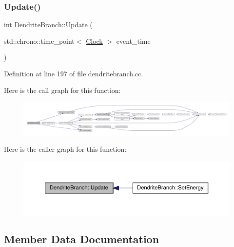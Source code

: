 \subsubsection{\texorpdfstring{Update()}{Update()}}
{\footnotesize\ttfamily int Dendrite\+Branch\+::\+Update (\begin{DoxyParamCaption}\item[{std\+::chrono\+::time\+\_\+point$<$ \hyperlink{universe_8h_a0ef8d951d1ca5ab3cfaf7ab4c7a6fd80}{Clock} $>$}]{event\+\_\+time }\end{DoxyParamCaption})}



Definition at line 197 of file dendritebranch.\+cc.

Here is the call graph for this function\+:
\nopagebreak
\begin{figure}[H]
\begin{center}
\leavevmode
\includegraphics[width=350pt]{class_dendrite_branch_a8540dfafeb5bd45f782ab31b8231b10f_cgraph}
\end{center}
\end{figure}
Here is the caller graph for this function\+:
\nopagebreak
\begin{figure}[H]
\begin{center}
\leavevmode
\includegraphics[width=350pt]{class_dendrite_branch_a8540dfafeb5bd45f782ab31b8231b10f_icgraph}
\end{center}
\end{figure}


\subsection{Member Data Documentation}
\mbox{\label{class_dendrite_branch_a8015119958f7581d826dcac2c21919c9}} 
